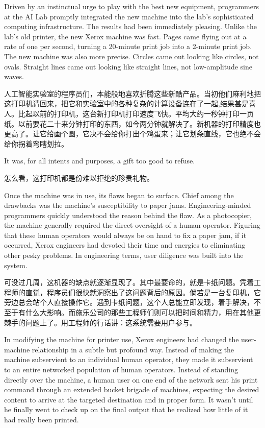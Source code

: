 \ifdefined\eng
Driven by an instinctual urge to play with the best new equipment, programmers at the AI Lab promptly integrated the new machine into the lab's sophisticated computing infrastructure. The results had been immediately pleasing. Unlike the lab's old printer, the new Xerox machine was fast. Pages came flying out at a rate of one per second, turning a 20-minute print job into a 2-minute print job. The new machine was also more precise. Circles came out looking like circles, not ovals. Straight lines came out looking like straight lines, not low-amplitude sine waves.
\fi

\ifdefined\chs
人工智能实验室的程序员们，本能般地喜欢折腾这些新酷产品。当初他们麻利地把这打印机请回来，把它和实验室中的各种复杂的计算设备连在了一起,结果甚是喜人。比起以前的打印机，这台新打印机打印速度飞快。平均大约一秒钟打印一页纸。以前要花二十来分钟打印的东西，如今两分钟就解决了。新机器的打印精度也更高了。让它给画个圆，它决不会给你打出个鸡蛋来；让它划条直线，它也绝不会给你拐着弯瞎划拉。
\fi

\ifdefined\eng
It was, for all intents and purposes, a gift too good to refuse.
\fi

\ifdefined\chs
怎么看，这打印机都是份难以拒绝的珍贵礼物。
\fi

\ifdefined\eng
Once the machine was in use, its flaws began to surface. Chief among the drawbacks was the machine's susceptibility to paper jams. Engineering-minded programmers quickly understood the reason behind the flaw. As a photocopier, the machine generally required the direct oversight of a human operator. Figuring that these human operators would always be on hand to fix a paper jam, if it occurred, Xerox engineers had devoted their time and energies to eliminating other pesky problems. In engineering terms, user diligence was built into the system.
\fi

\ifdefined\chs
可没过几周，这机器的缺点就逐渐显现了。其中最要命的，就是卡纸问题。凭着工程师的直觉，程序员们很快就洞察出了这问题背后的原因。倘若是一台复印机，它旁边总会站个人直接操作它。遇到卡纸问题，这个人总能立即发现，着手解决，不至于有什么大影响。而施乐公司的那些工程师们则可以把时间和精力，用在其他更棘手的问题上了。用工程师的行话讲：这系统需要用户参与。
\fi

\ifdefined\eng
In modifying the machine for printer use, Xerox engineers had changed the user-machine relationship in a subtle but profound way. Instead of making the machine subservient to an individual human operator, they made it subservient to an entire networked population of human operators. Instead of standing directly over the machine, a human user on one end of the network sent his print command through an extended bucket brigade of machines, expecting the desired content to arrive at the targeted destination and in proper form. It wasn't until he finally went to check up on the final output that he realized how little of it had really been printed.
\fi

